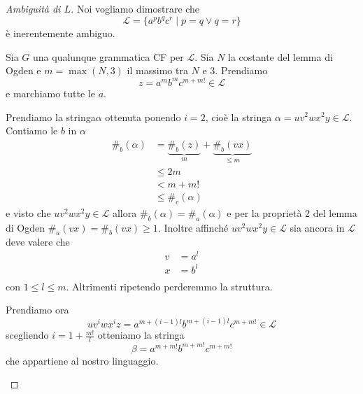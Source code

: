 \documentclass[12pt]{report}
\theoremstyle{definition}
\theoremstyle{regard}
\begin{document}
\begin{proof}[Ambiguità di $L$]
	Noi vogliamo dimostrare che
	$$ \mathcal{L} = \{ a^p b^q c^r \mid p = q \vee q = r \} $$
	è inerentemente ambiguo.
	
	Sia $G$ una qualunque grammatica CF per $\mathcal{L}$.
	Sia $N$ la costante del lemma di Ogden e $m = \max(N, 3) $ il massimo tra $N$ e 3.
	Prendiamo 
	$$ z = a^m b^m c^{m + m!} \in \mathcal{L}$$
	e marchiamo tutte le $a$.

	Prendiamo la stringa$\alpha$ ottenuta ponendo $i = 2$, cioè la stringa $\alpha = u v^2 w x^2 y \in \mathcal{L}$.
	Contiamo le $b$ in $\alpha$
	\begin{align*}
		\#_b(\alpha) &= \underbrace{\#_b(z)}_{m} + \underbrace{\#_b(vx)}_{\leq m} \\
		&\leq 2m \\ 
		&< m + m! \tag{Visto che $m$ è almeno 3} \\
		&\leq \#_c(\alpha) \tag{Le $c$ rimaste sono almeno quelle che c'erano prima}
	\end{align*}
	e visto che $uv^2 w x^2 y \in \mathcal{L}$ allora $\#_b(\alpha) = \#_a(\alpha)$ e per la proprietà 2 del lemma di Ogden $\#_a(vx) = \#_b(vx) \geq 1$.
	Inoltre affinché $u v^2 w x^2 y \in \mathcal{L}$ sia ancora in $\mathcal{L}$ deve valere che
	\begin{align*}
		v &= a^l \\
		x &= b^l \\
	\end{align*}
	con $1 \leq l \leq m$.
	Altrimenti ripetendo perderemmo la struttura.

	Prendiamo ora
	$$ u v^i w x^i z = a^{m + (i - 1)l}b^{m + (i - 1)l} c^{m + m!} \in \mathcal{L} $$
	scegliendo $i = 1 + \frac{m!}{l}$ otteniamo la stringa 
	$$ \beta = a^{m + m!} b^{m + m!} c^{m + m!} $$
	che appartiene al nostro linguaggio.
	\begin{figure}[H]
		\centering
		\begin{subfigure}{.3\textwidth}
			\centering
\end{subfigure}
\end{figure}
\end{proof}
\end{document}
